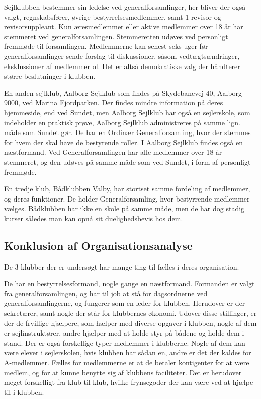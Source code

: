 Sejlklubben bestemmer sin ledelse ved generalforsamlinger, her bliver der også valgt, regnskabsfører, øvrige
bestyrrelsesmedlemmer, samt 1 revisor og revisorsuppleant. Kun æresmedlemmer eller aktive medlemmer over 18 år har
stemmeret ved generalforsamlingen. Stemmeretten udøves ved personligt fremmøde til forsamlingen. Medlemmerne kan senest
seks uger før generalforsamlinger sende forslag til diskussioner, såsom vedtægtsændringer, eksklussioner af medlemmer
ol. Det er altså demokratiske valg der håndterer større beslutninger i klubben.

En anden sejlklub, Aalborg Sejlklub som findes på Skydebanevej 40, Aalborg 9000, ved Marina Fjordparken. Der findes
mindre information på deres hjemmeside, end ved Sundet, men Aalborg Sejlklub har også en sejlerskole, som indeholder en
praktisk prøve,  Aalborg Sejlklub administreres på samme lign. måde som Sundet gør. De har en
Ordinær Generalforsamling, hvor der stemmes for hvem der skal have de bestyrende roller. I Aalborg Sejlklub findes også
en næstformand. Ved Generalforsamlingen har alle medlemmer over 18 år stemmeret, og den udøves på samme måde som ved
Sundet, i form af personligt fremmøde.\citep{AalborgSejlklub}

En tredje klub, Bådklubben Valby, har stortset samme fordeling af medlemmer, og deres funktioner. De holder
Generalforsamling, hvor bestyrrende medlemmer vælges. Bådklubben har ikke en skole på samme måde, men de har dog stadig
kurser således man kan opnå sit duelighedsbevis hos dem.\citep{BaadklubbenValby}


\subsection{Konklusion af Organisationsanalyse}

De 3 klubber der er undersøgt har mange ting til fælles i deres organisation.

De har en bestyrrelsesformand, nogle gange en næstformand. Formanden er valgt fra generalforsamlingen, og har til job at
stå for dagsordnerne ved generalforsamlingerne, og fungerer som en leder for klubben. Herudover er der sekretærer, samt
nogle der står for klubbernes økonomi. Udover disse stillinger, er der de frvillige hjælpere, som hælper med diverse
opgaver i klubben, nogle af dem er sejlinstruktører, andre hjælper med at holde styr på bådene og holde dem i stand. Der
er også forskellige typer medlemmer i klubberne. Nogle af dem kan være elever i sejlerskolen, hvis klubben har sådan en,
andre er det der kaldes for A-medlemmer. Fælles for medlemmerne er at de betaler kontigenter for at være medlem, og for
at kunne benytte sig af klubbens faciliteter. Det er herudover meget forskelligt fra klub til klub, hvilke frynsegoder
der kan være ved at hjælpe til i klubben.

